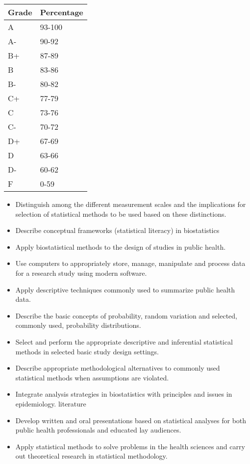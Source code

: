 \documentclass[10pt]{article}
\begin{document}
\bigskip

\begin{table}[htdp]
\begin{tabular}{ll}
Grade & Percentage \\
\hline
A & 93-100 \\
A- & 90-92 \\
B+ & 87-89 \\
B & 83-86 \\
B- & 80-82 \\
C+ & 77-79 \\
C & 73-76 \\
C- & 70-72 \\
D+ & 67-69 \\
D & 63-66 \\
D- & 60-62\\
F & 0-59 \\
\end{tabular}
\end{table}%


  \clearpage
\bigskip
{}
\begin{itemize}
\item Distinguish among the different measurement scales and the implications for selection of statistical methods to be used based on these distinctions.
\item Describe conceptual frameworks (statistical literacy) in biostatistics
\item Apply biostatistical methods to the design of studies in public health.
\item Use computers to appropriately store, manage, manipulate and process data for a research study using modern software.
\item Apply descriptive techniques commonly used to summarize public health data. 
\item Describe the basic concepts of probability, random variation and selected, commonly used, probability distributions.
\item Select and perform the appropriate descriptive and inferential statistical methods in selected basic study design settings.
\item Describe appropriate methodological alternatives to commonly used statistical methods when assumptions are violated.
\item Integrate analysis strategies in biostatistics with principles and issues in epidemiology.
literature
\item Develop written and oral presentations based on statistical analyses for both public health professionals and educated lay audiences.
\item Apply statistical methods to solve problems in the health sciences and carry out theoretical research in statistical methodology.
\end{itemize}
  
\end{document}
